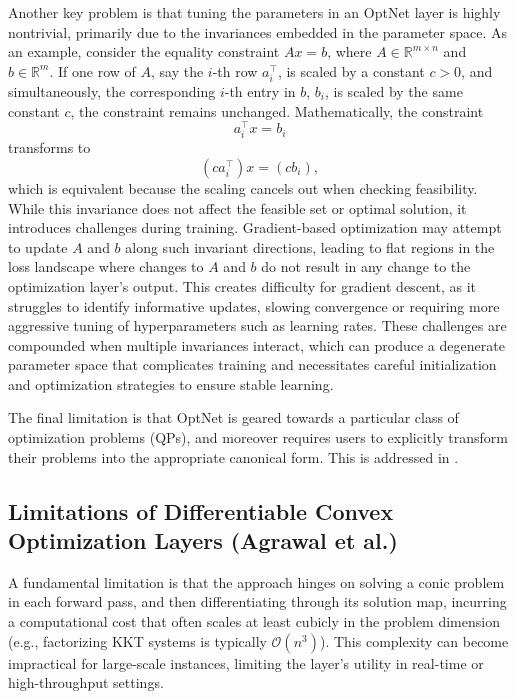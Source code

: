 \documentclass{article}
\begin{document}
Another key problem is that tuning the parameters in an OptNet layer is highly nontrivial, primarily due to the invariances embedded in the parameter space. As an example, consider the equality constraint \(A x = b\), where \(A \in \mathbb{R}^{m \times n}\) and \(b \in \mathbb{R}^m\). If one row of \(A\), say the \(i\)-th row \(a_i^\top\), is scaled by a constant \(c > 0\), and simultaneously, the corresponding \(i\)-th entry in \(b\), \(b_i\), is scaled by the same constant \(c\), the constraint remains unchanged. Mathematically, the constraint 
\[
a_i^\top x = b_i
\]
transforms to 
\[
(c a_i^\top) x = (c b_i),
\]
which is equivalent because the scaling cancels out when checking feasibility. While this invariance does not affect the feasible set or optimal solution, it introduces challenges during training. Gradient-based optimization may attempt to update \(A\) and \(b\) along such invariant directions, leading to flat regions in the loss landscape where changes to \(A\) and \(b\) do not result in any change to the optimization layer’s output. This creates difficulty for gradient descent, as it struggles to identify informative updates, slowing convergence or requiring more aggressive tuning of hyperparameters such as learning rates. These challenges are compounded when multiple invariances interact, which can produce a degenerate parameter space that complicates training and necessitates careful initialization and optimization strategies to ensure stable learning. 

The final limitation is that OptNet is geared towards a particular class of optimization problems (QPs), and moreover requires users to explicitly transform their problems into the appropriate canonical form. This is addressed in \citet{differentiableconvexoptimizationlayers}.

\subsection{Limitations of Differentiable Convex Optimization Layers (Agrawal et al.)}

A fundamental limitation is that the approach hinges on solving a conic problem in each forward pass, and then differentiating through its solution map, incurring a computational cost that often scales at least cubicly in the problem dimension (e.g., factorizing KKT systems is typically $\mathcal{O}(n^3)$). This complexity can become impractical for large-scale instances, limiting the layer’s utility in real-time or high-throughput settings.
\end{document}
